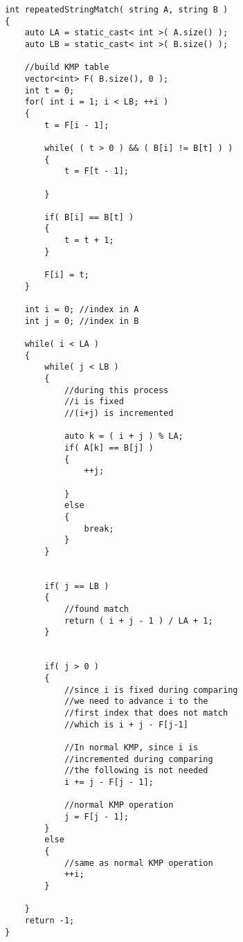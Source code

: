 \begin{lstlisting}[style=customc, caption={KMP}]
int repeatedStringMatch( string A, string B )
{
    auto LA = static_cast< int >( A.size() );
    auto LB = static_cast< int >( B.size() );

    //build KMP table
    vector<int> F( B.size(), 0 );
    int t = 0;
    for( int i = 1; i < LB; ++i )
    {
        t = F[i - 1];

        while( ( t > 0 ) && ( B[i] != B[t] ) )
        {
            t = F[t - 1];

        }

        if( B[i] == B[t] )
        {
            t = t + 1;
        }

        F[i] = t;
    }

    int i = 0; //index in A
    int j = 0; //index in B

    while( i < LA )
    {
        while( j < LB )
        {
            //during this process
            //i is fixed
            //(i+j) is incremented

            auto k = ( i + j ) % LA;
            if( A[k] == B[j] )
            {
                ++j;

            }
            else
            {
                break;
            }
        }


        if( j == LB )
        {
            //found match
            return ( i + j - 1 ) / LA + 1;
        }


        if( j > 0 )
        {
            //since i is fixed during comparing
            //we need to advance i to the
            //first index that does not match
            //which is i + j - F[j-1]

            //In normal KMP, since i is
            //incremented during comparing
            //the following is not needed
            i += j - F[j - 1];

            //normal KMP operation
            j = F[j - 1];
        }
        else
        {
            //same as normal KMP operation
            ++i;
        }

    }
    return -1;
}
\end{lstlisting}
